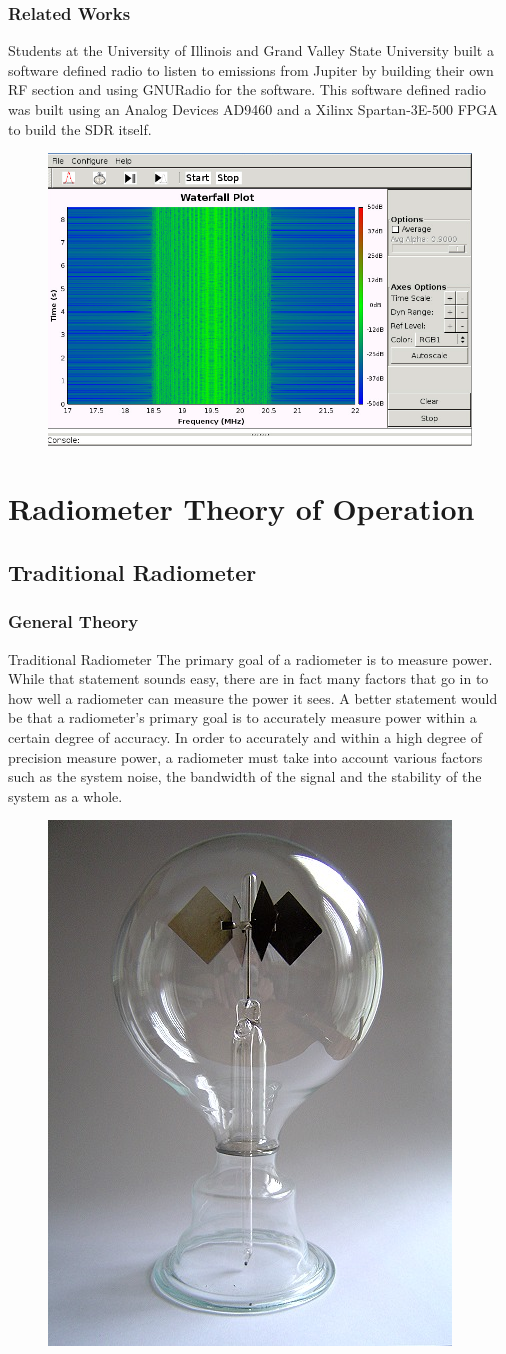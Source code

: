 \documentclass[notes]{beamer}
\begin{document}
\begin{frame}
\frametitle{Related Works} 
Students at the University of Illinois and Grand Valley State University built a software defined radio to listen to emissions from Jupiter\cite{Behnke} by building their own RF section and using GNURadio for the software.  This software defined radio was built using an Analog Devices AD9460 and a Xilinx Spartan-3E-500 FPGA to build the SDR itself.

\begin{figure}\label{behnke}
\includegraphics[width=0.5\linewidth]{images/behnke_GUI.png}
\end{figure}
\end{frame}
\section{Radiometer Theory of Operation}
\subsection{Traditional Radiometer}
\begin{frame}
\frametitle{General Theory}
\begin{block}{Traditional Radiometer}
The primary goal of a radiometer is to measure power.  While that statement sounds easy, there are in fact many factors that go in to how well a radiometer can measure the power it sees.  A better statement would be that a radiometer's primary goal is to accurately measure power within a certain degree of accuracy.  In order to accurately and within a high degree of precision measure power, a radiometer must take into account various factors such as the system noise, the bandwidth of the signal and the stability of the system as a whole. 
\end{block}

\begin{figure}\label{crookes}
\includegraphics[width=0.15\linewidth]{images/Crookes_radiometer.jpg}
\end{figure}
\end{frame}
\end{document}
